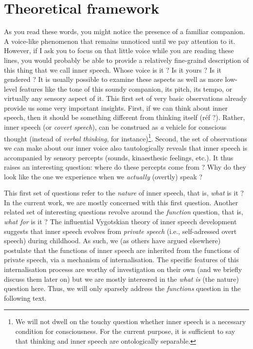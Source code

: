 \documentclass[a4paper,12pt,twoside,openright,oldfontcommands]{memoir}
\let\rmarkdownfootnote\footnote%
\def\footnote{\protect\rmarkdownfootnote}
\newcommand{\initial}[1]{
	\lettrine[lines=3,lhang=0.33,nindent=0em]{
		\color{gray}
     		{\textsc{#1}}}{}}
\begin{document}
\chapter{Theoretical framework}\label{intro}

\initial{A}s you read these words, you might notice the presence of a
familiar companion. A voice-like phenomenon that remains unnoticed until
we pay attention to it. However, if I ask you to focus on that little
voice while you are reading these lines, you would probably be able to
provide a relatively fine-graind description of this thing that we call
inner speech. Whose voice is it ? Is it yours ? Is it gendered ? It is
usually possible to examine these aspects as well as more low-level
features like the tone of this soundy companion, its pitch, its tempo,
or virtually any sensory aspect of it. This first set of very basic
observations already provide us some very important insights. First, if
we can think about inner speech, then it should be something different
from thinking itself (réf ?). Rather, inner speech (or \emph{covert
speech}), can be construed as \emph{a} vehicle for conscious thought
(instead of \emph{verbal thinking}, for instance)\footnote{We will not
  dwell on the touchy question whether inner speech is a necessary
  condition for consciousness. For the current purpose, it is sufficient
  to say that thinking and inner speech are ontologically separable.}.
Second, the set of observations we can make about our inner voice also
tautologically reveals that inner speech is accompanied by sensory
percepts (sounds, kinaesthesic feelings, etc.). It thus raises an
interesting question: where do these percepts come from ? Why do they
look like the one we experience when we \emph{actually} (overtly) speak
?

This first set of questions refer to the \emph{nature} of inner speech,
that is, \emph{what} is it ? In the current work, we are mostly
concerned with this first question. Another related set of interesting
questions revolve around the \emph{function} question, that is,
\emph{what for} is it ? The influential Vygotskian theory of inner
speech development suggests that inner speech evolves from \emph{private
speech} (i.e., self-adressed overt speech) during childhood. As such, we
(as others have argued elsewhere) postulate that the functions of inner
speech are inherited from the functions of private speech, via a
mechanism of internalisation. The specific features of this
internalisation processs are worthy of investigation on their own (and
we briefly discuss them later on) but we are mostly interesred in the
\emph{what is} (the nature) question here. Thus, we will only sparsely
address the \emph{functions} question in the following text.
\end{document}
